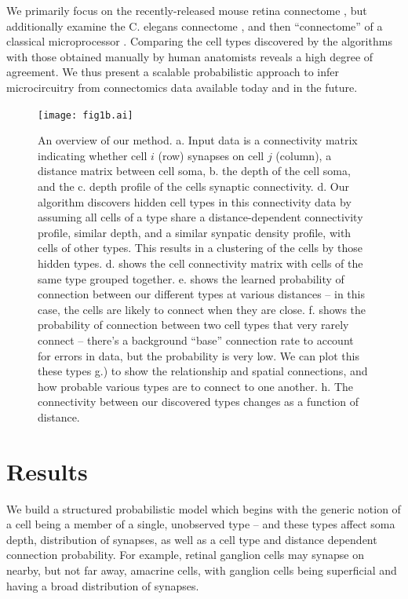 \documentclass{article}
\begin{document}
We primarily focus on the recently-released mouse retina connectome
\autocite{Helmstaedter2013}, but additionally examine the C. elegans
connectome \autocite{White1986}, and then ``connectome'' of a
classical microprocessor \autocite{James2010}. Comparing the cell
types discovered by the algorithms with those obtained manually by
human anatomists reveals a high degree of agreement. We thus present a
scalable probabilistic approach to infer microcircuitry from
connectomics data available today and in the future. 

\begin{figure}
  \centering 
  \centerline{\texttt{[image: fig1b.ai]}}
  \caption{An overview of our method. a. Input data is a connectivity
    matrix indicating whether cell $i$ (row) synapses on cell $j$
    (column), a distance matrix between cell soma, b. the depth of the
    cell soma, and the c. depth profile of the cells synaptic
    connectivity. d. Our algorithm discovers hidden cell types in this
    connectivity data by assuming all cells of a type share a
    distance-dependent connectivity profile, similar depth, and a
    similar synpatic density profile, with cells of other types.  This
    results in a clustering of the cells by those hidden
    types. d. shows the cell connectivity matrix with cells of the
    same type grouped together. e. shows the learned probability of
    connection between our different types at various distances -- in
    this case, the cells are likely to connect when they are
    close. f. shows the probability of connection between two cell types
that very rarely connect -- there's a background ``base'' connection rate
to account for errors in data, but the probability is very low. 
We can plot this these types g.) to show the relationship and spatial
connections, and how probable various types are to connect to one
another. h. The connectivity between our discovered types changes as a
function of distance. }

\label{fig:overview}
\end{figure}

\section{Results}

We build a structured probabilistic model which begins with the
generic notion of a cell being a member of a single, unobserved type
-- and these types affect soma depth, distribution of synapses, as
well as a cell type and distance dependent connection probability. For
example, retinal ganglion cells may synapse on nearby, but not far
away, amacrine cells, with ganglion cells being superficial and having
a broad distribution of synapses.  
\end{document}
